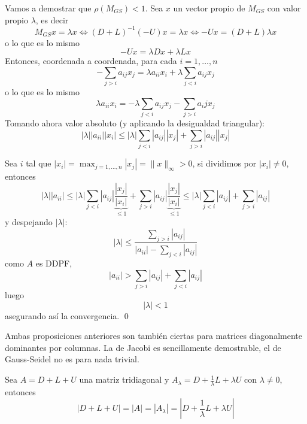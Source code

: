     \begin{dem}
        Vamos a demostrar que $\rho(M_{GS})<1$. Sea $x$ un vector propio de $M_{GS}$ con valor propio $\lambda$, es decir
        $$M_{GS} x = \lambda x \iff (D+L)^{-1}(-U) x = \lambda x \iff -Ux=(D+L)\lambda x$$
        o lo que es lo mismo
        $$-Ux=\lambda Dx + \lambda Lx $$
        Entonces, coordenada a coordenada, para cada $i=1,\ldots,n$
        $$-\sum_{j>i} a_{ij} x_j=\lambda a_{ii}x_i + \lambda \sum_{j<i} a_{ij} x_j$$
        o lo que es lo mismo
        $$\lambda a_{ii} x_i = - \lambda \sum_{j < i} a_{ij} x_j - \sum_{j>i}a_ij x_j$$
        Tomando ahora valor absoluto (y aplicando la desigualdad triangular):
        $$|\lambda| |a_{ii}| |x_i| \leq |\lambda| \sum_{j < i} |a_{ij}| |x_j| + \sum_{j>i} |a_{ij}| |x_j|$$
        
        Sea $i$ tal que $|x_i|=\max_{j=1,\ldots, n} |x_j|=\|x\|_{\infty} > 0$, si dividimos por $|x_i| \neq 0$, entonces
        $$|\lambda| |a_{ii}| \leq |\lambda| \sum_{j < i} |a_{ij}| \underbrace{\dfrac{|x_j|}{|x_i|}}_{\leq 1} + \sum_{j>i} |a_{ij}| \underbrace{\dfrac{|x_j|}{|x_i|}}_{\leq 1} \leq |\lambda| \sum_{j < i} |a_{ij}| + \sum_{j>i} |a_{ij}|$$
        y despejando $|\lambda|$:
        $$\displaystyle |\lambda|\leq \dfrac{\underset{{j > i}}{\sum} |a_{ij}|}{|a_{ii}|-\underset{{j < i}}{\sum} |a_{ij}|}$$
        como $A$ es DDPF, 
        $$|a_{ii}| > \sum_{j > i} |a_{ij}| + \sum_{j < i} |a_{ij}|$$
        luego
        $$|\lambda|<1$$
        asegurando así la convergencia.
    \qed\end{dem}
    \begin{obs}
        Ambas proposiciones anteriores son también ciertas para matrices diagonalmente dominantes por columnas. La de Jacobi es sencillamente demostrable, el de Gauss-Seidel no es para nada trivial.
    \end{obs}
    \begin{lem} \label{lemadet} Sea $A=D+L+U$ una matriz tridiagonal y $A_{\lambda}= D +\frac{1}{\lambda} L +\lambda U$ con  $\lambda \neq 0$, entonces $$|D+L+U|=|A|=|A_{\lambda}|=\left|D+\dfrac{1}{\lambda}L +\lambda U \right|$$ 
    \end{lem}
